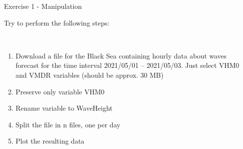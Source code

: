 \documentclass[9pt]{beamer}
\begin{document}
\begin{frame}[fragile]{Exercise 1 - Manipulation}

Try to perform the following steps:

\ 

    \begin{enumerate}
        \item Download a file for the Black Sea containing hourly data about waves forecast for the time interval 2021/05/01 -- 2021/05/03. Just select VHM0 and VMDR variables (should be approx. 30 MB)
        \item Preserve only variable VHM0
        \item Rename variable to WaveHeight
        \item Split the file in n files, one per day
        \item Plot the resulting data
    \end{enumerate}
\end{frame}
\end{document}
